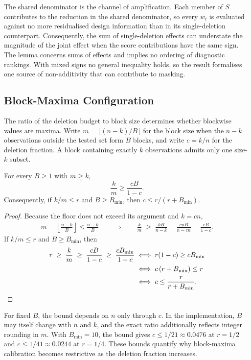 \documentclass[../main.tex]{subfiles}
\begin{document}
The shared denominator is the channel of amplification. Each member of \(S\) contributes to the reduction in the shared denominator, so every \(w_i\) is evaluated against no more residualised design information than in its single-deletion counterpart. Consequently, the sum of single-deletion effects can understate the magnitude of the joint effect when the score contributions have the same sign. The lemma concerns sums of effects and implies no ordering of diagnostic rankings. With mixed signs no general inequality holds, so the result formalises one source of non-additivity that can contribute to masking.

\subsection{Block-Maxima Configuration}
\label{app:deriv-blocks}

The ratio of the deletion budget to block size determines whether blockwise values are maxima. Write \(m=\lfloor(n-k)/B\rfloor\) for the block size when the \(n-k\) observations outside the tested set form \(B\) blocks, and write \(c=k/n\) for the deletion fraction. A block containing exactly \(k\) observations admits only one size-\(k\) subset.

\begin{proposition}
\label{prop:block-ratio}
For every \(B\geq1\) with \(m\geq k\),
\[
\frac{k}{m}\geq\frac{cB}{1-c}.
\]
Consequently, if \(k/m\leq r\) and \(B\geq B_{\min}\), then \(c\leq r/(r+B_{\min})\).
\end{proposition}

\begin{proof}
Because the floor does not exceed its argument and \(k=cn\),
\begin{align*}
m=\left\lfloor\frac{n-k}{B}\right\rfloor\leq\frac{n-k}{B}
\qquad\Longrightarrow\qquad
\frac{k}{m}
\;\geq\;
\frac{kB}{n-k}
=\frac{cnB}{n-cn}
=\frac{cB}{1-c}.
\end{align*}
If \(k/m\leq r\) and \(B\geq B_{\min}\), then
\begin{align*}
r\;\geq\;\frac{k}{m}\;\geq\;\frac{cB}{1-c}\;\geq\;\frac{cB_{\min}}{1-c}
&\iff r(1-c)\geq cB_{\min}\\
&\iff c\,(r+B_{\min})\leq r\\
&\iff c\leq\frac{r}{r+B_{\min}}.
\qedhere
\end{align*}
\end{proof}

For fixed \(B\), the bound depends on \(n\) only through \(c\). In the implementation, \(B\) may itself change with \(n\) and \(k\), and the exact ratio additionally reflects integer rounding in \(m\). With \(B_{\min}=10\), the bound gives \(c\leq 1/21\approx0.0476\) at \(r=1/2\) and \(c\leq 1/41\approx0.0244\) at \(r=1/4\). These bounds quantify why block-maxima calibration becomes restrictive as the deletion fraction increases.
\end{document}
